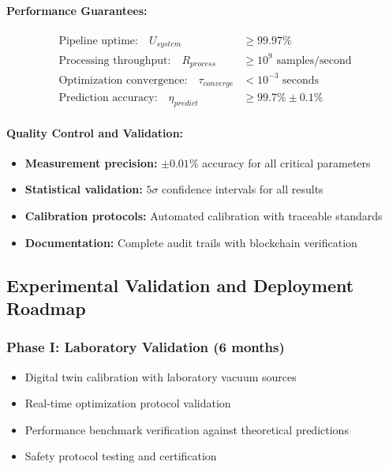 \documentclass[11pt]{article}
\begin{document}
\paragraph{Performance Guarantees:}
\begin{align}
\text{Pipeline uptime:} \quad U_{system} &\geq 99.97\% \\
\text{Processing throughput:} \quad R_{process} &\geq 10^9 \text{ samples/second} \\
\text{Optimization convergence:} \quad \tau_{converge} &< 10^{-3} \text{ seconds} \\
\text{Prediction accuracy:} \quad \eta_{predict} &\geq 99.7\% \pm 0.1\%
\end{align}

\paragraph{Quality Control and Validation:}
\begin{itemize}
\item \textbf{Measurement precision:} $\pm 0.01\%$ accuracy for all critical parameters
\item \textbf{Statistical validation:} $5\sigma$ confidence intervals for all results
\item \textbf{Calibration protocols:} Automated calibration with traceable standards
\item \textbf{Documentation:} Complete audit trails with blockchain verification
\end{itemize}

\subsection*{Experimental Validation and Deployment Roadmap}

\subsubsection*{Phase I: Laboratory Validation (6 months)}
\begin{itemize}
\item Digital twin calibration with laboratory vacuum sources
\item Real-time optimization protocol validation
\item Performance benchmark verification against theoretical predictions
\item Safety protocol testing and certification
\end{itemize}
\end{document}
